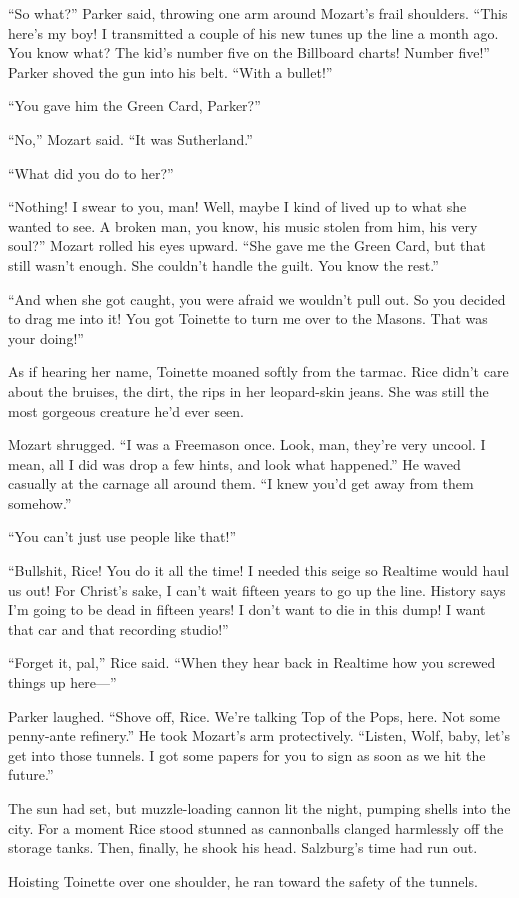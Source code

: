 ``So what?'' Parker said, throwing one arm around Mozart's frail shoulders. ``This here's my boy! I transmitted a couple of his new tunes up the line a month ago. You know what? The kid's number five on the Billboard charts! Number five!'' Parker shoved the gun into his belt. ``With a bullet!''

``You gave him the Green Card, Parker?''

``No,'' Mozart said. ``It was Sutherland.''

``What did you do to her?''

``Nothing! I swear to you, man! Well, maybe I kind of lived up to what she wanted to see. A broken man, you know, his music stolen from him, his very soul?'' Mozart rolled his eyes upward. ``She gave me the Green Card, but that still wasn't enough. She couldn't handle the guilt. You know the rest.''

``And when she got caught, you were afraid we wouldn't pull out. So you decided to drag me into it! You got Toinette to turn me over to the Masons. That was your doing!''

As if hearing her name, Toinette moaned softly from the tarmac. Rice didn't care about the bruises, the dirt, the rips in her leopard-skin jeans. She was still the most gorgeous creature he'd ever seen.

Mozart shrugged. ``I was a Freemason once. Look, man, they're very uncool. I mean, all I did was drop a few hints, and look what happened.'' He waved casually at the carnage all around them. ``I knew you'd get away from them somehow.''

``You can't just use people like that!''

``Bullshit, Rice! You do it all the time! I needed this seige so Realtime would haul us out! For Christ's sake, I can't wait fifteen years to go up the line. History says I'm going to be dead in fifteen years! I don't want to die in this dump! I want that car and that recording studio!''

``Forget it, pal,'' Rice said. ``When they hear back in Realtime how you screwed things up here—''

Parker laughed. ``Shove off, Rice. We're talking Top of the Pops, here. Not some penny-ante refinery.'' He took Mozart's arm protectively. ``Listen, Wolf, baby, let's get into those tunnels. I got some papers for you to sign as soon as we hit the future.''

The sun had set, but muzzle-loading cannon lit the night, pumping shells into the city. For a moment Rice stood stunned as cannonballs clanged harmlessly off the storage tanks. Then, finally, he shook his head. Salzburg's time had run out.

Hoisting Toinette over one shoulder, he ran toward the safety of the tunnels.